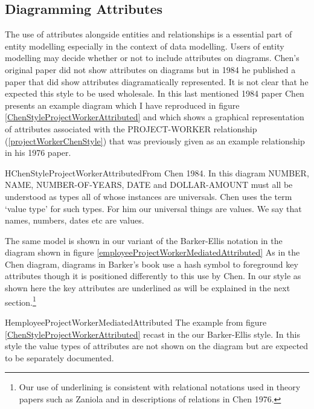 \subsection*{Diagramming Attributes}
\mynote
The use of attributes alongside entities and relationships is a essential part of entity modelling especially in the context of data modelling. Users of entity modelling may decide whether or not to include attributes on diagrams. Chen's original paper did not show attributes on diagrams  but in 1984
he published a paper that did show attributes diagramatically represented. It is not clear that he expected this style to be used wholesale. 
\mynote
In this last mentioned 1984 paper Chen presents an example diagram 
which I have reproduced in figure  \ref{ChenStyleProjectWorkerAttributed} 
and which shows a graphical representation of attributes associated with the PROJECT-WORKER relationship (\ref{projectWorkerChenStyle}) that was previously given as an example relationship in his 1976 paper.

\begin{erboxedFigure} {H}{ChenStyleProjectWorkerAttributed}{From Chen 1984. In this diagram NUMBER, NAME, NUMBER-OF-YEARS, DATE and DOLLAR-AMOUNT must all be understood as types all of whose instances are universals. Chen uses the term `value type' for such types. For him our universal things are values. We  say that names, numbers, dates etc are values.}

\end{erboxedFigure}

The same model is shown in our variant of the Barker-Ellis notation
 in the diagram shown in figure \ref{employeeProjectWorkerMediatedAttributed}
As in the Chen diagram, diagrams in Barker's book use a hash symbol to foreground key attributes though it  is positioned differently to this use by Chen. In our style as shown here the key attributes are underlined as will be explained in the next section.\footnote{Our use of underlining is consistent with relational notations used in theory papers such as Zaniola and in descriptions of relations in Chen 1976.}

\begin{erboxedFigure} {H}{employeeProjectWorkerMediatedAttributed}
{The example from figure \ref{ChenStyleProjectWorkerAttributed} recast in the our Barker-Ellis style. 
In this style the value types of attributes are not shown on the diagram but are expected to be 
separately documented. }


\end{erboxedFigure}


 

